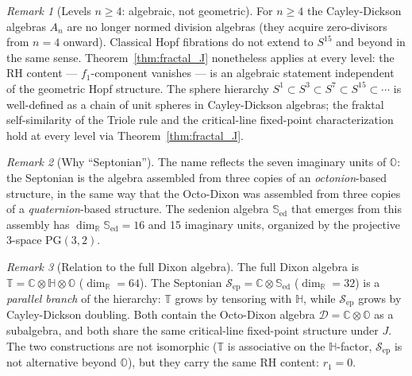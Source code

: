\documentclass[12pt,a4paper]{article}
\theoremstyle{remark}
\newtheorem*{remark}{Remark}
\begin{document}
\begin{remark}[Levels $n\ge4$: algebraic, not geometric]
For $n\ge4$ the Cayley-Dickson algebras $A_n$ are no longer normed
division algebras (they acquire zero-divisors from $n=4$ onward).
Classical Hopf fibrations do not extend to $S^{15}$ and beyond in the
same sense.
Theorem~\ref{thm:fractal_J} nonetheless applies at every level:
the RH content — $f_1$-component vanishes — is an algebraic statement
independent of the geometric Hopf structure.
The sphere hierarchy $S^1\subset S^3\subset S^7\subset S^{15}\subset\cdots$
is well-defined as a chain of unit spheres in Cayley-Dickson algebras;
the fraktal self-similarity of the Triole rule and the critical-line
fixed-point characterization hold at every level via
Theorem~\ref{thm:fractal_J}.
\end{remark}

\begin{remark}[Why ``Septonian'']
The name reflects the seven imaginary units of $\mathbb{O}$:
the Septonian is the algebra assembled from three copies of an
\emph{octonion}-based structure, in the same way that the Octo-Dixon
was assembled from three copies of a \emph{quaternion}-based structure.
The sedenion algebra $\mathbb{S}_{\mathrm{ed}}$ that emerges from this assembly has
$\dim_\mathbb{R}\mathbb{S}_{\mathrm{ed}}=16$ and 15 imaginary units, organized
by the projective 3-space $\mathrm{PG}(3,2)$.
\end{remark}

\begin{remark}[Relation to the full Dixon algebra]
The full Dixon algebra is $\mathbb{T}=\mathbb{C}\otimes\mathbb{H}\otimes\mathbb{O}$
($\dim_{\mathbb{R}}=64$).
The Septonian $\mathcal{S}_{\mathrm{ep}}=\mathbb{C}\otimes\mathbb{S}_{\mathrm{ed}}$
($\dim_{\mathbb{R}}=32$) is a \emph{parallel branch} of the hierarchy:
$\mathbb{T}$ grows by tensoring with $\mathbb{H}$, while
$\mathcal{S}_{\mathrm{ep}}$ grows by Cayley-Dickson doubling.
Both contain the Octo-Dixon algebra $\mathcal{D}=\mathbb{C}\otimes\mathbb{O}$
as a subalgebra, and both share the same critical-line fixed-point
structure under $J$.
The two constructions are not isomorphic ($\mathbb{T}$ is associative on the
$\mathbb{H}$-factor, $\mathcal{S}_{\mathrm{ep}}$ is not alternative beyond $\mathbb{O}$),
but they carry the same RH content: $r_1=0$.
\end{remark}

\end{document}
